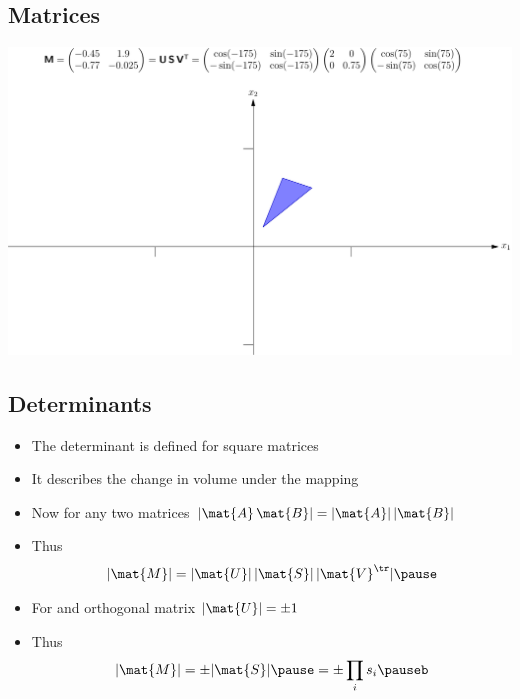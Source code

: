 
\begin{slide}
\section[-2]{Matrices}

\pb \pause
\begin{center}
  \includegraphics[width=\linewidth]{matrixPicture1}
\end{center}
\end{slide}




\begin{slide}
\section[-2]{Determinants}

\begin{PauseHighLight}
  \begin{itemize}
  \item The determinant is defined for square matrices\pause
  \item It describes the change in volume under the mapping\pause
  \item Now for any two matrices $|\mat{A}\,\mat{B}| =
    |\mat{A}|\,|\mat{B}|$\pause
  \item Thus
    \begin{align*}
      |\mat{M}| = |\mat{U}| \, |\mat{S}| \, |\mat{V}^\tr|\pause
    \end{align*}
  \item For and orthogonal matrix $|\mat{U}| = \pm 1$\pause
  \item Thus
    \begin{align*}
      |\mat{M}| = \pm |\mat{S}|\pause = \pm \prod_i s_i\pauseb
    \end{align*}
  \end{itemize}
\end{PauseHighLight}

\end{slide}


